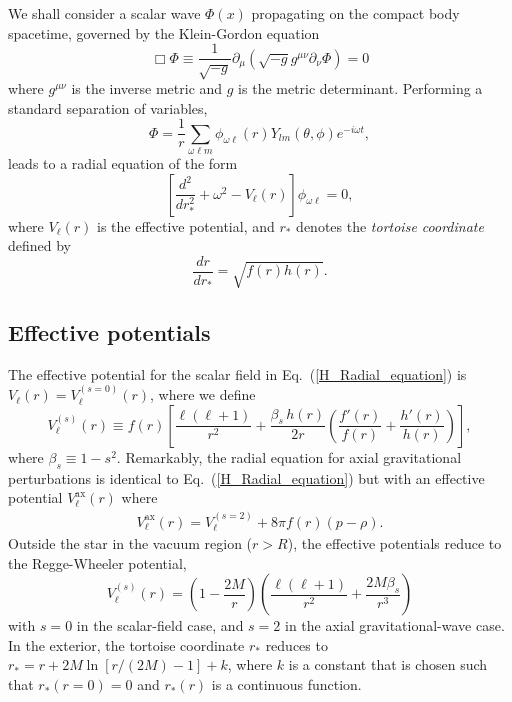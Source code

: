 \documentclass[aps,prd,longbibliography,reprint,twocolumn,amsmath,amssymb,amsfonts,showpacs,footnote,superscriptaddress]{revtex4-1}%
\begin{document}
We shall consider a scalar wave $\Phi(x)$ propagating on the compact body spacetime, governed by the Klein-Gordon equation
\begin{equation}
\Box \Phi \equiv \frac{1}{\sqrt{-g}} \partial_{\mu} \left( \sqrt{-g} g^{\mu \nu} \partial_{\nu} \Phi \right) = 0
\end{equation}
where $g^{\mu \nu}$ is the inverse metric and
$
g %
$
 is the metric determinant. Performing a standard separation of variables,
\begin{equation}
\Phi = \frac{1}{r} \sum_{\omega \ell m} \phi_{\omega \ell}(r)  Y_{lm}(\theta, \phi) e^{-i \omega t} ,
\label{eq:sepvariables}
\end{equation}
leads to a radial equation of the form
\begin{equation}
\label{H_Radial_equation}
\left[\frac{d^{2}}{dr_{\ast}^{2}}+\omega^{2}-V_{\ell}(r)\right]\phi_{\omega\ell}= 0,
\end{equation}
where $V_{\ell}(r)$ is the effective potential, and $r_\ast$ denotes the \emph{tortoise coordinate} defined by
\begin{equation}
\frac{dr}{dr_\ast} =\sqrt{f(r)h(r)} .  \label{eq:tortoise}
\end{equation}

\subsection{Effective potentials}\label{subsec:Potentials}
The effective potential for the scalar field in Eq.~(\ref{H_Radial_equation}) is $V_{\ell}(r) = V_{\ell}^{(s=0)}(r)$, where we define
\begin{equation}\label{Inside_Potentiel}
  V_{\ell}^{(s)}(r) \equiv f(r)\left[\frac{\ell(\ell+1)}{r^2}+\frac{\beta_s \, h(r)}{2r}\left(\frac{f'(r)}{f(r)}+\frac{h'(r)}{h(r)}\right)\right] ,
\end{equation}
where $\beta_s \equiv 1-s^2$.
Remarkably, the radial equation for axial gravitational perturbations is identical to Eq.~(\ref{H_Radial_equation}) but with an effective potential $V_{\ell}^{\text{ax}}(r)$ where \cite{Cardoso:2014sna}
\begin{eqnarray}\label{RW_Potentiel_axialGW}
V_{\ell}^{\text{ax}}(r) = V_{\ell}^{(s=2)} + 8 \pi f(r) (p - \rho)  .
\end{eqnarray}
%
Outside the star in the vacuum region ($r>R$), the effective potentials reduce to the Regge-Wheeler potential,
\begin{equation}\label{RW_Potentiel}
V^{(s)}_{\ell}(r) =\left(1-\frac{2M}{r}\right)\left(\frac{\ell(\ell+1)}{r^2}+\frac{2M \beta_s}{r^3}\right)
\end{equation}
with $s=0$ in the scalar-field case, and $s=2$ in the axial gravitational-wave case. In the exterior, the tortoise coordinate $r_\ast$ reduces to $r_\ast = r+ 2M \ln [r/(2M) -1]+k$, where $k$ is a constant that is chosen such that $r_\ast(r=0) = 0$ and $r_\ast(r)$ is a continuous function.
\end{document}
